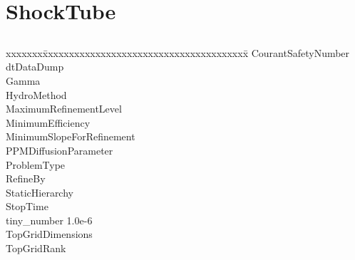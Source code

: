 \documentclass{book}
\begin{document}
\subsection{\cello}

\section{ShockTube} \label{s:ShockTube}

\subsection{\enzo}

{\parametersize
\begin{tabbing}
xxxxxxx\=xxxxxxxxxxxxxxxxxxxxxxxxxxxxxxxxxxxxxxx\=\kill
\> CourantSafetyNumber     \\
\> dtDataDump              \\
\> Gamma                   \\
\> HydroMethod             \\
\> MaximumRefinementLevel         \\
\> MinimumEfficiency            \\
\> MinimumSlopeForRefinement    \\
\> PPMDiffusionParameter          \\
\> ProblemType                    \\
\> RefineBy                       \\
\> StaticHierarchy                \\
\> StopTime                \\
\> tiny\_number            \> 1.0e-6   \\
\> TopGridDimensions       \\
\> TopGridRank            
\end{tabbing}}

\subsection{\cello}
\end{document}

